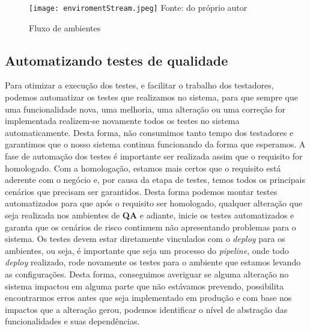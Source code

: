       \begin{figure}[h!]
        \label{Imagem:2}
        \caption{Fluxo de ambientes}
        \texttt{[image: enviromentStream.jpeg]}
        \newline
        \small{Fonte: do próprio autor}
      \end{figure}

    \subsection{Automatizando testes de qualidade}
      Para otimizar a execução dos testes, e facilitar o trabalho dos testadores,
      podemos automatizar os testes que realizamos no sistema, para que sempre que
      uma funcionalidade nova, uma melhoria, uma alteração ou uma correção for
      implementada realizem-se novamente todos os testes no sistema automaticamente.
      Desta forma, não consumimos tanto tempo dos testadores e garantimos que o
      nosso sistema continua funcionando da forma que esperamos. A fase de automação
      dos testes é importante ser realizada assim que o requisito for homologado.
      Com a homologação, estamos mais certos que o requisito está aderente com o
      negócio e, por causa da etapa de testes, temos todos os principais cenários
      que precisam ser garantidos. Desta forma podemos montar testes automatizados
      para que após o requisito ser homologado, qualquer alteração que seja realizada
      nos ambientes de \textbf{QA} e adiante, inicie os testes automatizados e
      garanta que os cenários de risco continuem não apresentando problemas para
      o sistema. \newline
      Os testes devem estar diretamente vinculados com o \textit{deploy} para os
      ambientes, ou seja, é importante que seja um processo do \textit{pipeline},
      onde todo \textit{deploy} realizado, rode novamente os testes para o ambiente
      que estamos levando as configurações. Desta forma, conseguimos averiguar se
      alguma alteração no sistema impactou em alguma parte que não estávamos prevendo,
      possibilita encontrarmos erros antes que seja implementado em produção e
      com base nos impactos que a alteração gerou, podemos identificar o nível de
      abstração das funcionalidades e suas dependências.

